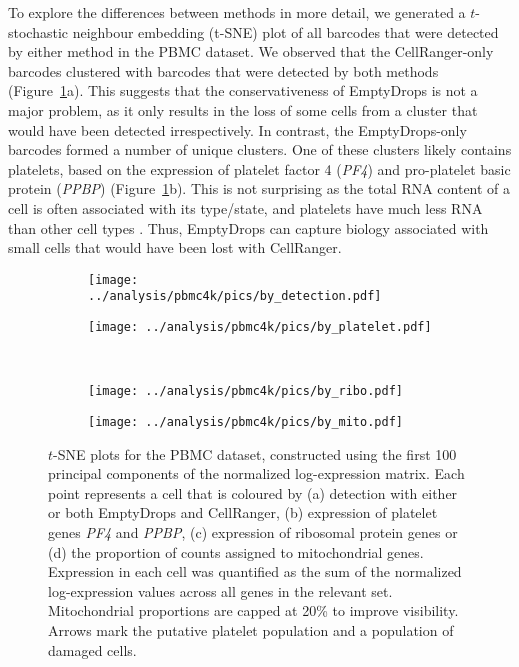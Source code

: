 \documentclass[10pt,letterpaper]{article}
\begin{document}
To explore the differences between methods in more detail, we generated a $t$-stochastic neighbour embedding (t-SNE) plot \cite{van2008visualizing} of all barcodes that were detected by either method in the PBMC dataset.
We observed that the CellRanger-only barcodes clustered with barcodes that were detected by both methods (Figure~\ref{fig:realtsne}a).
This suggests that the conservativeness of EmptyDrops is not a major problem, as it only results in the loss of some cells from a cluster that would have been detected irrespectively.
In contrast, the EmptyDrops-only barcodes formed a number of unique clusters.
One of these clusters likely contains platelets, based on the expression of platelet factor 4 (\textit{PF4}) and pro-platelet basic protein (\textit{PPBP}) (Figure~\ref{fig:realtsne}b). 
This is not surprising as the total RNA content of a cell is often associated with its type/state, and platelets have much less RNA than other cell types \cite{rowley2012platelet}.
Thus, EmptyDrops can capture biology associated with small cells that would have been lost with CellRanger.

\begin{figure}[btp]
    \begin{subfigure}{0.49\textwidth}
        \texttt{[image: ../analysis/pbmc4k/pics/by\_detection.pdf]}
        \caption{}
    \end{subfigure}
    \begin{subfigure}{0.49\textwidth}
        \texttt{[image: ../analysis/pbmc4k/pics/by\_platelet.pdf]}
        \caption{}
    \end{subfigure} \\[0.05in]
    \begin{subfigure}{0.49\textwidth}
        \texttt{[image: ../analysis/pbmc4k/pics/by\_ribo.pdf]}
        \caption{}
    \end{subfigure}
    \begin{subfigure}{0.49\textwidth}
        \texttt{[image: ../analysis/pbmc4k/pics/by\_mito.pdf]}
        \caption{}
    \end{subfigure}
    \caption{$t$-SNE plots for the PBMC dataset, constructed using the first 100 principal components of the normalized log-expression matrix.
        Each point represents a cell that is coloured by (a) detection with either or both EmptyDrops and CellRanger, 
        (b) expression of platelet genes \textit{PF4} and \textit{PPBP}, (c) expression of ribosomal protein genes or (d) the proportion of counts assigned to mitochondrial genes.
        Expression in each cell was quantified as the sum of the normalized log-expression values across all genes in the relevant set.
        Mitochondrial proportions are capped at 20\% to improve visibility.
        Arrows mark the putative platelet population and a population of damaged cells.
    }
    \label{fig:realtsne}
\end{figure}
\end{document}
